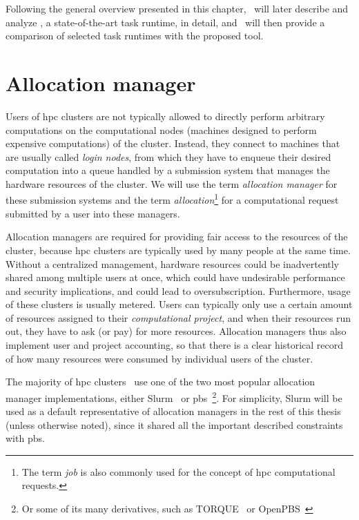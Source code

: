 Following the general overview presented in this chapter,~ will later
describe and analyze \dask{}, a state-of-the-art task runtime, in detail,
and~ will then provide a comparison of selected task runtimes with the
proposed \hyperqueue{} tool.


\section{Allocation manager}
\label{challenge:allocation-manager}
Users of \gls{hpc} clusters are not typically allowed to directly perform
arbitrary computations on the computational nodes (machines designed to perform expensive
computations) of the cluster. Instead, they connect to machines that are usually called
\emph{login nodes}, from which they have to enqueue their desired computation into a queue
handled by a submission system that manages the hardware resources of the cluster. We will use the
term \emph{allocation manager} for these submission systems and the term
\emph{allocation}\footnote{The term \emph{job} is also commonly used for the concept of
\gls{hpc} computational requests.} for a computational request submitted by a
user into these managers.

Allocation managers are required for providing fair access to the resources of the cluster, because
\gls{hpc} clusters are typically used by many people at the same time. Without a
centralized management, hardware resources could be inadvertently shared among multiple users at
once, which could have undesirable performance and security implications, and could lead to
oversubscription. Furthermore, usage of these clusters is usually metered. Users can typically only
use a certain amount of resources assigned to their \emph{computational project}, and when their
resources run out, they have to ask (or pay) for more resources. Allocation managers thus also
implement user and project accounting, so that there is a clear historical record of how many
resources were consumed by individual users of the cluster.

The majority of \gls{hpc} clusters~\cite{slurm-schedmd} use one of the two
most popular allocation manager implementations, either Slurm~\cite{slurm} or
\gls{pbs}~\cite{pbs}\footnote{Or some of its many derivatives,
such as TORQUE~\cite{torque} or OpenPBS~\cite{openpbs}}. For simplicity,
Slurm will be used as a default representative of allocation managers in the rest of this thesis
(unless otherwise noted), since it shared all the important described constraints with
\gls{pbs}.

